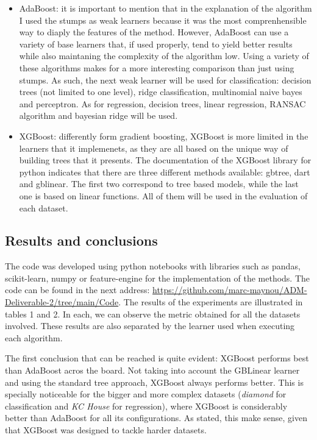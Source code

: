 \documentclass{article}
\begin{document}
\begin{itemize}
    \item AdaBoost: it is important to mention that in the explanation of the algorithm I used the stumps as weak learners because it was the most comprenhensible way to diaply the features of the method. However, AdaBoost can use a variety of base learners that, if used properly, tend to yield better results while also maintaning the complexity of the algorithm low. Using a variety of these algorithms makes for a more interesting comparison than just using stumps. As such, the next weak learner will be used for classification: decision trees (not limited to one level), ridge classification, multinomial naive bayes and perceptron. As for regression, decision trees, linear regression, RANSAC algorithm and bayesian ridge will be used. 

    \item XGBoost: differently form gradient boosting, XGBoost is more limited in the learners that it implemenets, as they are all based on the unique way of building trees that it presents. The documentation of the XGBoost library for python indicates that there are three different methods available: gbtree, dart and gblinear. The first two correspond to tree based models, while the last one is based on linear functions. All of them will be used in the evaluation of each dataset.
\end{itemize}
\subsection{Results and conclusions}

The code was developed using python notebooks with libraries such as pandas, scikit-learn, numpy or feature-engine for the implementation of the methods. The code can be found in the next address: \url{https://github.com/marc-maynou/ADM-Deliverable-2/tree/main/Code}. The results of the experiments are illustrated in tables 1 and 2. In each, we can observe the metric obtained for all the datasets involved. These results are also separated by the learner used when executing each algorithm.

The first conclusion that can be reached is quite evident: XGBoost performs best than AdaBoost acros the board. Not taking into account the GBLinear learner and using the standard tree approach, XGBoost always performs better. This is specially noticeable for the bigger and more complex datasets (\textit{diamond} for classification and \textit{KC House} for regression), where XGBoost is considerably better than AdaBoost for all its configurations. As stated, this make sense, given that XGBoost was designed to tackle harder datasets.
\end{document}
